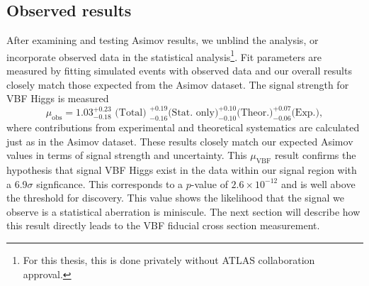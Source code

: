\subsection{Observed results}
After examining and testing Asimov results, we unblind the analysis, or incorporate observed data in the statistical analysis\footnote{For this thesis, this is done privately without ATLAS collaboration approval.}. Fit parameters are measured by fitting simulated events with observed data and our overall results closely match those expected from the Asimov dataset. The signal strength for VBF Higgs is measured 
\begin{equation}
\mu_{\text{obs}} = 1.03 ^{+0.23}_{-0.18} \text{ (Total) } ^{+0.19}_{-0.16} \text{(Stat. only)} ^{+0.10}_{-0.10} \text{(Theor.)} ^{+0.07}_{-0.06} \text{(Exp.)},
\end{equation}
where contributions from experimental and theoretical systematics are  calculated just as in the Asimov dataset. These results closely match our expected Asimov values in terms of signal strength and uncertainty. This $\mu_\text{VBF}$ result confirms the hypothesis that signal VBF Higgs exist in the data within our signal region with a 6.9$\sigma$ signficance. This corresponds to a $p$-value of $2.6\times10^{-12}$ and is well above the threshold for discovery. This value shows the likelihood that the signal we observe is a statistical aberration is miniscule. The next section will describe how this result directly leads to the VBF fiducial cross section measurement. 


